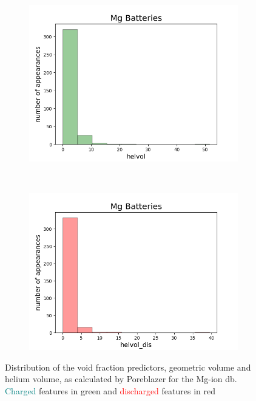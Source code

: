 \begin{figure}[h]
\begin{subfigure}{0.23\textwidth}
         \includegraphics[width=\linewidth]{result/figures/distribution/Mg_distrof_helvol.png}
     \end{subfigure}
          ~ 
     \begin{subfigure}{0.23\textwidth}
         \centering
         \includegraphics[width=\linewidth]{result/figures/distribution/Mg_distrof_helvol_dis.png}
     \end{subfigure}
\caption{Distribution of the void fraction predictors, geometric volume and helium volume, as calculated by Poreblazer for the Mg-ion db. \textcolor{teal}{Charged} features in green and \textcolor{red}{discharged} features in red}
\label{fig:Mg_distri_VF}
\end{figure}

